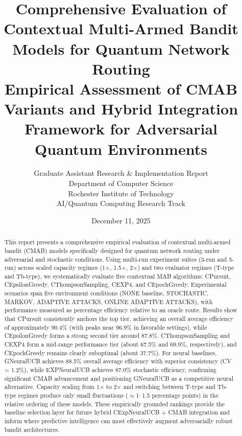 \documentclass[12pt,a4paper]{article}
\title{\textbf{Comprehensive Evaluation of Contextual Multi-Armed Bandit Models for Quantum Network Routing}\\
\large{Empirical Assessment of CMAB Variants and Hybrid Integration Framework for Adversarial Quantum Environments}}
\author{Graduate Assistant Research \& Implementation Report\\ 
Department of Computer Science \\ 
Rochester Institute of Technology \\ 
AI/Quantum Computing Research Track}
\date{December 11, 2025}
\begin{document}
\maketitle

\begin{abstract}
This report presents a comprehensive empirical evaluation of contextual multi-armed bandit (CMAB) models specifically designed for quantum network routing under adversarial and stochastic conditions. Using multi-run experiment suites (3-run and 5-run) across scaled capacity regimes (1$\times$, 1.5$\times$, 2$\times$) and two evaluator regimes (T-type and Tb-type), we systematically evaluate five contextual MAB algorithms: CPursuit, CEpsilonGreedy, CThompsonSampling, CEXP4, and CEpochGreedy. Experimental scenarios span five environment conditions (NONE baseline, STOCHASTIC, MARKOV, ADAPTIVE ATTACKS, ONLINE ADAPTIVE ATTACKS), with performance measured as percentage efficiency relative to an oracle route. Results show that CPursuit consistently anchors the top tier, achieving an overall average efficiency of approximately 90.4\% (with peaks near 96.9\% in favorable settings), while CEpsilonGreedy forms a strong second tier around 87.8\%. CThompsonSampling and CEXP4 form a mid-range performance tier (about 67.5\% and 69.9\%, respectively), and CEpochGreedy remains clearly suboptimal (about 37.7\%). For neural baselines, GNeuralUCB achieves 88.5\% overall average efficiency with superior consistency (CV = 1.2\%), while EXPNeuralUCB achieves 87.0\% stochastic efficiency, confirming significant CMAB advancement and positioning GNeuralUCB as a competitive neural alternative. Capacity scaling from 1$\times$ to 2$\times$ and switching between T-type and Tb-type regimes produce only small fluctuations ($\approx$1--1.5 percentage points) in the relative ordering of these models. These empirically grounded rankings provide the baseline selection layer for future hybrid CExpNeuralUCB + CMAB integration and inform where predictive intelligence can most effectively augment adversarially robust bandit architectures.
\end{abstract}

\newpage
{\tableofcontents}

\newpage
\end{document}
